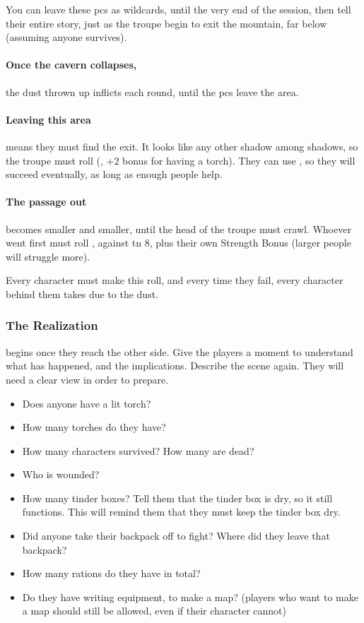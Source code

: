 \begin{multicols}{2}
You can leave these \glspl{pc} as wildcards, until the very end of the session, then tell their entire story, just as the troupe begin to exit the mountain, far below (assuming anyone survives).


\paragraph{Once the cavern collapses,}
the dust thrown up inflicts  each \gls{round}, until the \glspl{pc} leave the \gls{area}.

\paragraph{Leaving this area}
means they must find the exit.
It looks like any other shadow among shadows, so the troupe must roll  (\tn[10], +2 bonus for having a torch).
They can use , so they will succeed eventually, as long as enough people help.

\paragraph{The passage out}
becomes smaller and smaller, until the head of the troupe must crawl.
Whoever went first must roll , against \gls{tn} 8, plus their own Strength Bonus (larger people will struggle more).

Every character must make this roll, and every time they fail, every character behind them takes  due to the dust.

\subsubsection{The Realization}
begins once they reach the other side.
Give the players a moment to understand what has happened, and the implications.
Describe the scene again.
They will need a clear view in order to prepare.

\begin{itemize}
  \item
  Does anyone have a lit torch?
  \item
  How many torches do they have?
  \item
  How many characters survived?
  How many are dead?
  \item
  Who is wounded?
  \item
  How many tinder boxes?
  Tell them that the tinder box is dry, so it still functions.
  This will remind them that they must keep the tinder box dry.
  \item
  Did anyone take their backpack off to fight?
  Where did they leave that backpack?
  \item
  How many \glspl{ration} do they have in total?
  \item
  Do they have writing equipment, to make a map?
  (players who want to make a map should still be allowed, even if their character cannot)
\end{itemize}


\end{multicols}
